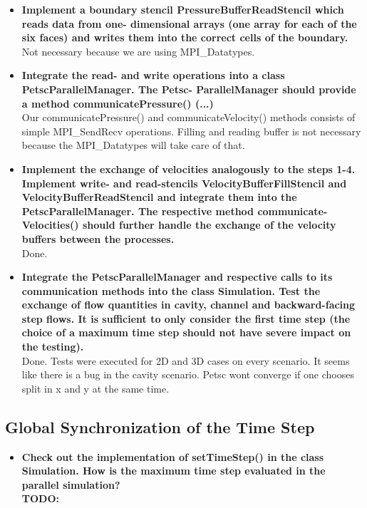 \documentclass[a4paper]{article}
\newcommand{\td}[1]{
	\textbf{\color{red}TODO: {#1}}
}
\begin{document}
\begin{itemize}
	\item \textbf{Implement a boundary stencil PressureBufferReadStencil which reads data from one- dimensional arrays (one array for each of the six faces) and writes them into the correct cells of the boundary.}\\
	Not necessary because we are using MPI\_Datatypes.
	
	\item \textbf{Integrate the read- and write operations into a class PetscParallelManager. The Petsc- ParallelManager should provide a method communicatePressure() (...)}\\
	Our communicatePressure() and communicateVelocity() methods consists of simple MPI\_SendRecv operations. Filling and reading buffer is not necessary because the MPI\_Datatypes will take care of that.
	
	\item \textbf{Implement the exchange of velocities analogously to the steps 1-4. Implement write- and read-stencils VelocityBufferFillStencil and VelocityBufferReadStencil and integrate them into the PetscParallelManager. The respective method communicate- Velocities() should further handle the exchange of the velocity buffers between the processes.}\\
	Done.
	
	\item \textbf{Integrate the PetscParallelManager and respective calls to its communication methods into the class Simulation. Test the exchange of flow quantities in cavity, channel and backward-facing step flows. It is sufficient to only consider the first time step (the choice of a maximum time step should not have severe impact on the testing).}\\
	Done. Tests were executed for 2D and 3D cases on every scenario. It seems like there is a bug in the cavity scenario. Petsc wont converge if one chooses split in x and y at the same time.
	
\end{itemize}
\subsection{Global Synchronization of the Time Step}
\begin{itemize}
	\item \textbf{Check out the implementation of setTimeStep() in the class Simulation. How is the maximum time step evaluated in the parallel simulation?}\\
	\td{}

\end{itemize}
\end{document}
